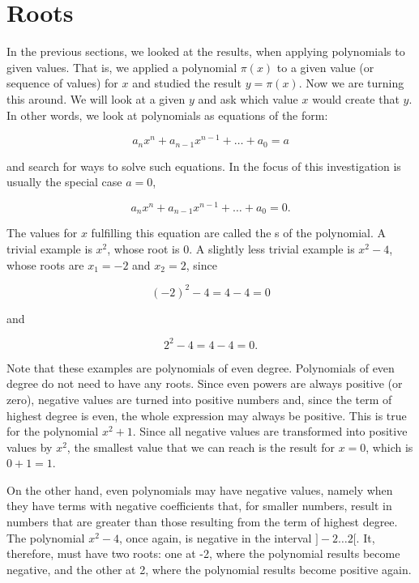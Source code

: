 \documentclass[tikz]{scrreprt}
\begin{document}
\section{Roots}

In the previous sections, we looked at the results,
when applying polynomials to given values.
That is, we applied a polynomial $\pi(x)$ to
a given value (or sequence of values) for $x$ 
and studied the result $y = \pi(x)$.
Now we are turning this around. We will look at
a given $y$ and ask which value $x$ would
create that $y$. In other words, 
we look at polynomials as equations of the form:

\begin{equation}
a_nx^n + a_{n-1}x^{n-1} + \dots + a_0 = a
\end{equation}

and search for ways to solve such equations.
In the focus of this investigation is usually
the special case $a=0$, \ie\:

\begin{equation}
a_nx^n + a_{n-1}x^{n-1} + \dots + a_0 = 0.
\end{equation}

The values for $x$ fulfilling this equation
are called the s of the polynomial.
A trivial example is $x^2$, whose root is 0.
A slightly less trivial example is $x^2 - 4$,
whose roots are $x_1 = -2$ and $x_2 = 2$, since

\[
(-2)^2 - 4 = 4 - 4 = 0
\]

and

\[
2^2 - 4 = 4 - 4 = 0.
\]

Note that these examples are polynomials of even degree.
Polynomials of even degree do not need to have any roots.
Since even powers are always positive (or zero), negative values
are turned into positive numbers and, since the term of highest
degree is even, the whole expression may always be positive.
This is true for the polynomial $x^2 + 1$. Since all negative values
are transformed into positive values by $x^2$, the smallest value
that we can reach is the result for $x=0$, which is $0+1=1$.

On the other hand, even polynomials may have negative values,
namely when they have terms with negative coefficients that, 
for smaller numbers,
result in numbers that are greater than those resulting from
the term of highest degree. 
The polynomial $x^2 - 4$, once again, is negative
in the interval $]-2\dots 2[$. It, therefore, must have two roots:
one at -2, where the polynomial results become negative, and the other at 2,
where the polynomial results become positive again.
\end{document}
